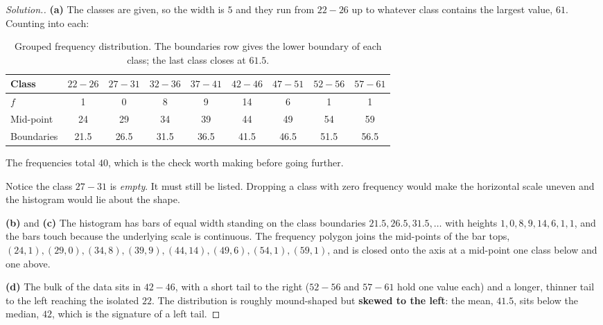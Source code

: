 \documentclass[11pt,a4paper]{article}
\theoremstyle{definition}
\newenvironment{solution}
  {\renewcommand{\qedsymbol}{}\begin{proof}[\textit{Solution}.]}
  {\end{proof}}
\begin{document}
\begin{solution}
\textbf{(a)} The classes are given, so the width is $5$ and they run from $22-26$ up to
whatever class contains the largest value, $61$. Counting into each:
\begin{table}[H]
\centering
\begin{tabular}{|l|c|c|c|c|c|c|c|c|}
\hline
Class & $22-26$ & $27-31$ & $32-36$ & $37-41$ & $42-46$ & $47-51$ & $52-56$ & $57-61$\\
\hline
$f$ & 1 & 0 & 8 & 9 & 14 & 6 & 1 & 1\\
Mid-point & 24 & 29 & 34 & 39 & 44 & 49 & 54 & 59\\
Boundaries & 21.5 & 26.5 & 31.5 & 36.5 & 41.5 & 46.5 & 51.5 & 56.5\\
\hline
\end{tabular}
\caption{Grouped frequency distribution. The boundaries row gives the lower boundary of each class; the last class closes at $61.5$.}
\end{table}
The frequencies total $40$, which is the check worth making before going further.

Notice the class $27-31$ is \emph{empty}. It must still be listed. Dropping a class with
zero frequency would make the horizontal scale uneven and the histogram would lie about the
shape.

\textbf{(b)} and \textbf{(c)} The histogram has bars of equal width standing on the class
boundaries $21.5, 26.5, 31.5, \dots$ with heights $1, 0, 8, 9, 14, 6, 1, 1$, and the bars
touch because the underlying scale is continuous. The frequency polygon joins the
mid-points of the bar tops, $(24,1), (29,0), (34,8), (39,9), (44,14), (49,6), (54,1),
(59,1)$, and is closed onto the axis at a mid-point one class below and one above.

\textbf{(d)} The bulk of the data sits in $42-46$, with a short tail to the right ($52-56$
and $57-61$ hold one value each) and a longer, thinner tail to the left reaching the
isolated $22$. The distribution is roughly mound-shaped but \textbf{skewed to the left}:
the mean, $41.5$, sits below the median, $42$, which is the signature of a left tail.
\end{solution}
\end{document}
